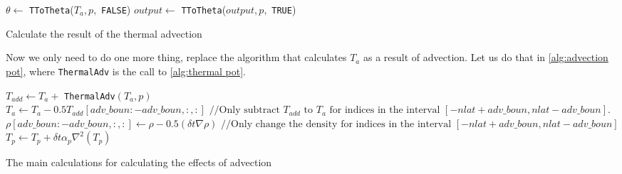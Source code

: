 \begin{algorithm}[!hbt]
    $\theta \leftarrow $ \texttt{TToTheta}($T_a, p,$ \texttt{FALSE}) \;
    $output \leftarrow $ \texttt{TToTheta}($output, p,$ \texttt{TRUE}) \;
     \;
    \caption{Calculate the result of the thermal advection}
    \label{alg:thermal pot}
\end{algorithm}

Now we only need to do one more thing, replace the algorithm that calculates $T_a$ as a result of advection. Let us do that in \autoref{alg:advection pot}, where \texttt{ThermalAdv} is the call 
to \autoref{alg:thermal pot}.

\begin{algorithm}
    $T_{add} \leftarrow T_a + $ \texttt{ThermalAdv}$(T_a, p)$\;
    $T_a \leftarrow T_a - 0.5T_{add}[adv\_boun:-adv\_boun, :, :] \text{ //Only subtract } T_{add} \text{ to } T_a \text{ for indices in the interval } [-nlat + adv\_boun, nlat - adv\_boun]$. \;
    $\rho[adv\_boun: -adv\_boun, :, :] \leftarrow \rho - 0.5(\delta t \nabla \rho) \text{ //Only change the density for indices in the interval } [-nlat + adv\_boun, nlat - adv\_boun]$ \;
    $T_p \leftarrow T_p + \delta t \alpha_p \nabla^2(T_p)$ \;
    \caption{The main calculations for calculating the effects of advection}
    \label{alg:advection pot}
\end{algorithm}